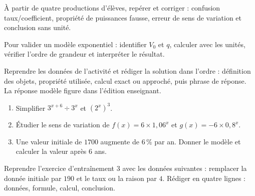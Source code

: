 \begin{activite}
À partir de quatre productions d'élèves, repérer et corriger : confusion taux/coefficient, propriété de puissances fausse, erreur de sens de variation et conclusion sans unité.

\end{activite}

\begin{traceecrite}Pour valider un modèle exponentiel : identifier $V_0$ et $q$, calculer avec les unités, vérifier l'ordre de grandeur et interpréter le résultat.\end{traceecrite}

\begin{exemple}
Reprendre les données de l'activité et rédiger la solution dans l'ordre : définition des objets, propriété utilisée, calcul exact ou approché, puis phrase de réponse. La réponse modèle figure dans l'édition enseignant.
\end{exemple}

\begin{exercice}[-- essentiel]
\begin{enumerate}\item Simplifier $3^{x+6}\div3^x$ et $(2^x)^3$.\item Étudier le sens de variation de $f(x)=6\times1{,}06^x$ et $g(x)=-6\times0{,}8^x$.\item Une valeur initiale de $1700$ augmente de $6\,\%$ par an. Donner le modèle et calculer la valeur après $6$ ans.\end{enumerate}
\end{exercice}


\begin{dm}Reprendre l'exercice d'entraînement 3 avec les données suivantes : remplacer la donnée initiale par $190$ et le taux ou la raison par $4$. Rédiger en quatre lignes : données, formule, calcul, conclusion.\end{dm}

